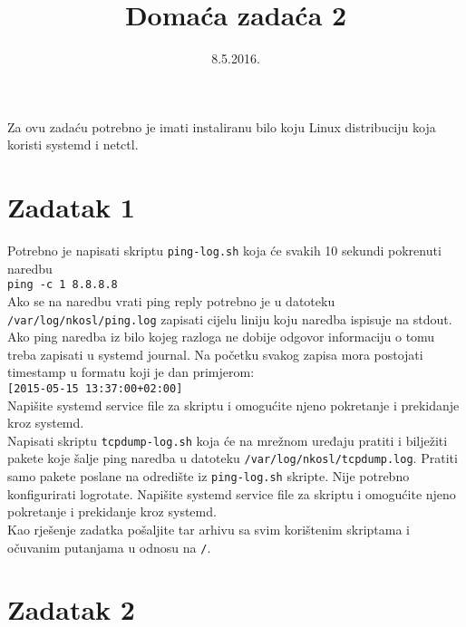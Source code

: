 \documentclass[12pt,a4paper]{article}
\begin{document}
	\title{Domaća zadaća 2}
	\date{\vspace{-5ex} 8.5.2016.}
	\maketitle

\noindent Za ovu zadaću potrebno je imati instaliranu bilo koju Linux distribuciju koja koristi systemd i netctl.

\section*{Zadatak 1}

Potrebno je napisati skriptu \texttt{ping-log.sh} koja će svakih 10 sekundi pokrenuti naredbu \\
\indent \texttt{ping -c 1 8.8.8.8}\\
Ako se na naredbu vrati ping reply potrebno je u datoteku \texttt{/var/log/nkosl/ping.log} zapisati cijelu liniju koju naredba ispisuje na stdout. Ako ping naredba iz bilo kojeg razloga ne dobije odgovor informaciju o tomu treba zapisati u systemd journal. Na početku svakog zapisa mora postojati timestamp u formatu koji je dan primjerom: \\
\indent \texttt{[2015-05-15 13:37:00+02:00]}\\
Napišite systemd service file za skriptu i omogućite njeno pokretanje i prekidanje kroz systemd.\\

Napisati skriptu \texttt{tcpdump-log.sh} koja će na mrežnom uređaju pratiti i bilježiti pakete koje šalje ping naredba u datoteku \texttt{/var/log/nkosl/tcpdump.log}. Pratiti samo pakete poslane na odredište iz \texttt{ping-log.sh} skripte. Nije potrebno konfigurirati logrotate. Napišite systemd service file za skriptu i omogućite njeno pokretanje i prekidanje kroz systemd.\\

Kao rješenje zadatka pošaljite tar arhivu sa svim korištenim skriptama i očuvanim putanjama u odnosu na \texttt{/}.

\section*{Zadatak 2}
\end{document}
